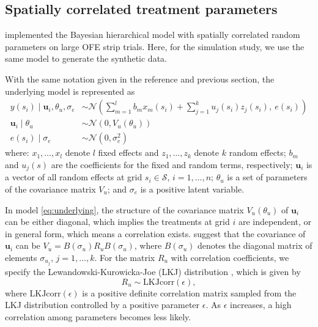 \documentclass[a4paper]{article} 	%
\newcommand{\N}{\mathcal{N}}
\begin{document}
	
	
\subsection{Spatially correlated treatment parameters}\label{sec:spatial}

\textcite{Cao2022Bayesian} implemented the Bayesian hierarchical model with spatially correlated random parameters on large OFE strip trials. Here, for the simulation study, we use the same model to generate the synthetic data. 
	
With the same notation given in the reference and previous section, the underlying model is represented as 
\begin{equation}\label{eq:underlying}
	\begin{split}
		y(s_i)\mid \bm{u}_i,\theta_u,\sigma_e &\sim \N\left( \sum_{m=1}^{l}b_m x_m(s_i) + \sum_{j=1}^{k}u_j(s_i)z_j(s_i),~e(s_i)\right) \\
		\bm{u}_i \mid \theta_u &\sim \N(0,V_u(\theta_u))\\
		e(s_i) \mid \sigma_e &\sim \N(0,\sigma_e^2) 
	\end{split}
\end{equation}
where: $x_1,\ldots, x_l$ denote $l$ fixed effects and $z_1,\ldots, z_k$ denote $k$ random effects; $b_m$ and $u_j(s)$ are the coefficients for the fixed and random terms, respectively; $\bm{u}_i$ is a vector of all random effects at grid $s_i\in\mathcal{S}$, $i=1,\ldots,n$; $\theta_u$ is a set of parameters of the covariance matrix $V_u$; and $\sigma_e$ is a positive latent variable. 
	

In model \eqref{eq:underlying}, the structure of the covariance matrix $V_u(\theta_u)$ of $\bm{u}_i$ can be either diagonal, which implies the treatments at grid $i$ are independent, or in general form, which means a correlation exists. \textcite{McElreath2015Statistical} suggest that the covariance of $\bm{u}_i$ can be $V_u = B(\sigma_u)R_uB(\sigma_u)$, where $B(\sigma_u)$ denotes the diagonal matrix of elements $\sigma_{u_j}$, $j=1,\ldots,k$. For the matrix $R_u$ with correlation coefficients, we specify the Lewandowski-Kurowicka-Joe (LKJ) distribution \parencite{Lewandowski2009Generating}, which is given by
\begin{equation}\label{eq:RPrior}
    R_u \sim \text{LKJcorr}(\epsilon),
\end{equation}
where $\text{LKJcorr}(\epsilon)$ is a positive definite correlation matrix sampled from the LKJ distribution controlled by a positive parameter $\epsilon$. As $\epsilon$ increases, a high correlation among parameters becomes less likely. 
\end{document}
